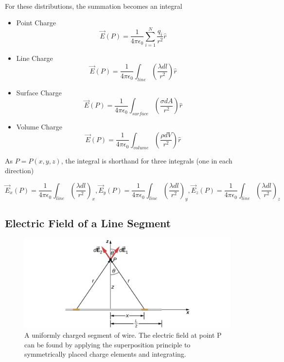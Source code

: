 \documentclass[14pt]{memoir}
\begin{document}
For these distributions, the summation becomes an integral
\begin{itemize}
\item Point Charge
	\begin{equation}
	\vec{E}(P) = \frac{1}{4 \pi \epsilon_0} \sum_{i=1}^{N}\frac{q_i}{r^2}\hat{r}
	\end{equation}
\item Line Charge
	\begin{equation}
	\vec{E}(P) = \frac{1}{4 \pi \epsilon_0} \int_{line}(\frac{\lambda dl}{r^2})\hat{r}
	\end{equation}
\item Surface Charge
	\begin{equation}
	\vec{E}(P) = \frac{1}{4 \pi \epsilon_0} \int_{surface}(\frac{\sigma dA}{r^2})\hat{r}
	\end{equation}
\item Volume Charge
	\begin{equation}
	\vec{E}(P) = \frac{1}{4 \pi \epsilon_0} \int_{volume}(\frac{\rho dV}{r^2})\hat{r}
	\end{equation}
	
\end{itemize}

As $P = P(x,y,z)$, the integral is shorthand for three integrals (one in each direction)

\begin{equation}
\vec{E}_x(P) = \frac{1}{4 \pi \epsilon_0} \int_{line}(\frac{\lambda dl}{r^2})_x,
\vec{E}_y(P) = \frac{1}{4 \pi \epsilon_0} \int_{line}(\frac{\lambda dl}{r^2})_y,
\vec{E}_z(P) = \frac{1}{4 \pi \epsilon_0} \int_{line}(\frac{\lambda dl}{r^2})_z
\end{equation}


\subsection{Electric Field of a Line Segment}

\begin{figure}[h]
\begin{center}
\includegraphics[scale=0.60]{fig/fig_05_23.jpg}
\caption{A uniformly charged segment of wire. The electric field at point P can be found by applying the superposition principle to symmetrically placed charge elements and integrating.
}
\label{fig:05_23}
\end{center}
\end{figure}
\end{document}
